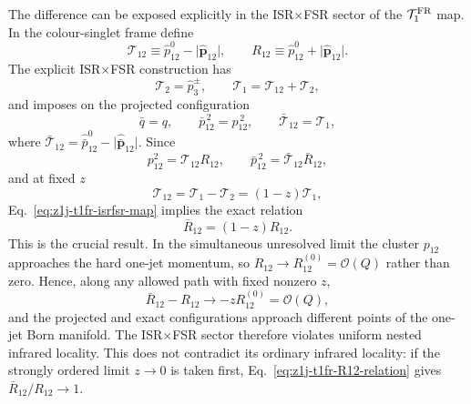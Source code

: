 \documentclass[11pt]{article}
\begin{document}
The difference can be exposed explicitly in the ISR$\times$FSR sector of the $\mathcal T_1^{\rm FR}$ map.
In the colour-singlet frame define
\begin{equation}
\mathcal T_{12}
\equiv
\hat p_{12}^0-\lvert\hat{\boldsymbol p}_{12}\rvert,
\qquad
R_{12}
\equiv
\hat p_{12}^0+\lvert\hat{\boldsymbol p}_{12}\rvert.
\label{eq:z1j-t1fr-t12-R12}
\end{equation}
The explicit ISR$\times$FSR construction has
\begin{equation}
\mathcal T_2=\hat p_3^{\pm},
\qquad
\mathcal T_1=\mathcal T_{12}+\mathcal T_2,
\label{eq:z1j-t1fr-isrfsr-jettiness}
\end{equation}
and imposes on the projected configuration
\begin{equation}
\bar q=q,
\qquad
\bar p_{12}^{\,2}=p_{12}^{\,2},
\qquad
\bar{\mathcal T}_{12}=\mathcal T_1,
\label{eq:z1j-t1fr-isrfsr-map}
\end{equation}
where $\bar{\mathcal T}_{12}=\hat{\bar p}_{12}^0-\lvert\hat{\boldsymbol{\bar p}}_{12}\rvert$.
Since
\begin{equation}
p_{12}^2=\mathcal T_{12}R_{12},
\qquad
\bar p_{12}^{\,2}=\bar{\mathcal T}_{12}\bar R_{12},
\label{eq:z1j-t1fr-mass-factorization}
\end{equation}
and at fixed $z$
\begin{equation}
\mathcal T_{12}
=\mathcal T_1-\mathcal T_2
=(1-z)\mathcal T_1,
\label{eq:z1j-t1fr-t12-fixed-z}
\end{equation}
Eq.~\eqref{eq:z1j-t1fr-isrfsr-map} implies the exact relation
\begin{equation}
\boxed{
\bar R_{12}=(1-z)R_{12}
}.
\label{eq:z1j-t1fr-R12-relation}
\end{equation}
This is the crucial result.  In the simultaneous unresolved limit the cluster $p_{12}$ approaches the hard
one-jet momentum, so $R_{12}\to R_{12}^{(0)}=\mathcal O(Q)$ rather than zero.  Hence, along any allowed path
with fixed nonzero $z$,
\begin{equation}
\bar R_{12}-R_{12}
\longrightarrow
-zR_{12}^{(0)}
=\mathcal O(Q),
\label{eq:z1j-t1fr-hard-mismatch}
\end{equation}
and the projected and exact configurations approach different points of the one-jet Born manifold.  The
ISR$\times$FSR sector therefore violates uniform nested infrared locality.  This does not contradict its
ordinary infrared locality: if the strongly ordered limit $z\to0$ is taken first,
Eq.~\eqref{eq:z1j-t1fr-R12-relation} gives $\bar R_{12}/R_{12}\to1$.
\end{document}
